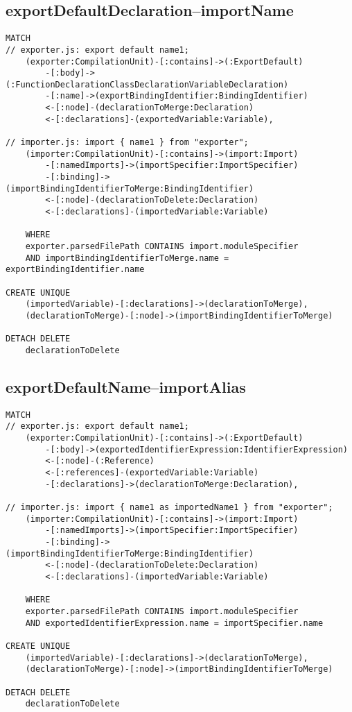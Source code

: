 \newpage
\subsection{exportDefaultDeclaration–importName}
\begin{lstlisting}[language=Cypher]
MATCH
// exporter.js: export default name1;
    (exporter:CompilationUnit)-[:contains]->(:ExportDefault)
        -[:body]->(:FunctionDeclarationClassDeclarationVariableDeclaration)
        -[:name]->(exportBindingIdentifier:BindingIdentifier)
        <-[:node]-(declarationToMerge:Declaration)
        <-[:declarations]-(exportedVariable:Variable),

// importer.js: import { name1 } from "exporter";
    (importer:CompilationUnit)-[:contains]->(import:Import)
        -[:namedImports]->(importSpecifier:ImportSpecifier)
        -[:binding]->(importBindingIdentifierToMerge:BindingIdentifier)
        <-[:node]-(declarationToDelete:Declaration)
        <-[:declarations]-(importedVariable:Variable)

    WHERE
    exporter.parsedFilePath CONTAINS import.moduleSpecifier
    AND importBindingIdentifierToMerge.name = exportBindingIdentifier.name

CREATE UNIQUE
    (importedVariable)-[:declarations]->(declarationToMerge),
    (declarationToMerge)-[:node]->(importBindingIdentifierToMerge)

DETACH DELETE
    declarationToDelete
\end{lstlisting}

\newpage
\subsection{exportDefaultName–importAlias}
\begin{lstlisting}[language=Cypher]
MATCH
// exporter.js: export default name1;
    (exporter:CompilationUnit)-[:contains]->(:ExportDefault)
        -[:body]->(exportedIdentifierExpression:IdentifierExpression)
        <-[:node]-(:Reference)
        <-[:references]-(exportedVariable:Variable)
        -[:declarations]->(declarationToMerge:Declaration),

// importer.js: import { name1 as importedName1 } from "exporter";
    (importer:CompilationUnit)-[:contains]->(import:Import)
        -[:namedImports]->(importSpecifier:ImportSpecifier)
        -[:binding]->(importBindingIdentifierToMerge:BindingIdentifier)
        <-[:node]-(declarationToDelete:Declaration)
        <-[:declarations]-(importedVariable:Variable)

    WHERE
    exporter.parsedFilePath CONTAINS import.moduleSpecifier
    AND exportedIdentifierExpression.name = importSpecifier.name

CREATE UNIQUE
    (importedVariable)-[:declarations]->(declarationToMerge),
    (declarationToMerge)-[:node]->(importBindingIdentifierToMerge)

DETACH DELETE
    declarationToDelete
\end{lstlisting}

